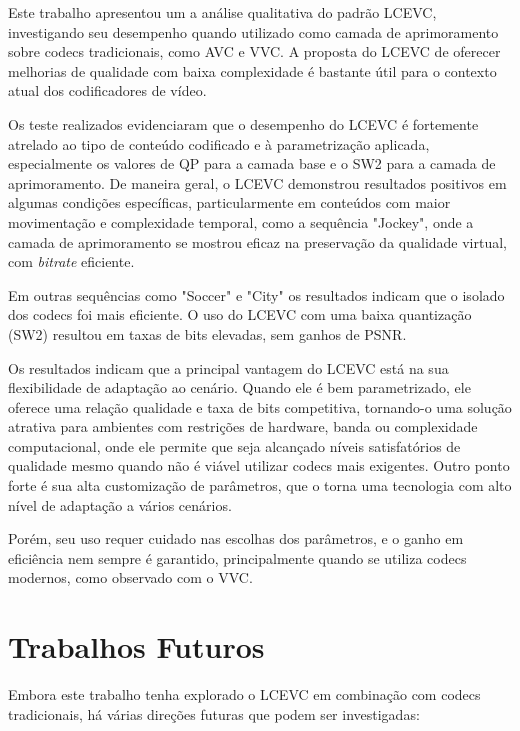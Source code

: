 Este trabalho apresentou um a análise qualitativa do padrão \acrfull{LCEVC},
investigando seu desempenho quando utilizado como camada de aprimoramento sobre
codecs tradicionais, como \acrshort{AVC} e \acrshort{VVC}. A proposta do 
\acrshort{LCEVC} de oferecer melhorias de qualidade com baixa complexidade
é bastante útil para o contexto atual dos codificadores de vídeo.

Os teste realizados evidenciaram que o desempenho do \acrshort{LCEVC} é 
fortemente atrelado ao tipo de conteúdo codificado e à parametrização
aplicada, especialmente os valores de QP para a camada base e o SW2
para a camada de aprimoramento. De maneira geral, o \acrshort{LCEVC}
demonstrou resultados positivos em algumas condições específicas,
particularmente em conteúdos com maior movimentação e complexidade
temporal, como a sequência "Jockey", onde a camada de aprimoramento
se mostrou eficaz na preservação da qualidade virtual, com \textit{bitrate}
eficiente.

Em outras sequências como "Soccer" e "City" os resultados indicam que
o isolado dos codecs foi mais eficiente. O uso do \acrshort{LCEVC} com
uma baixa quantização (SW2) resultou em taxas de bits elevadas, sem ganhos
de \acrshort{PSNR}.

Os resultados indicam que a principal vantagem do \acrshort{LCEVC} está
na sua flexibilidade de adaptação ao cenário. Quando ele é bem parametrizado,
ele oferece uma relação qualidade e taxa de bits competitiva, tornando-o uma
solução atrativa para ambientes com restrições de hardware, banda ou complexidade
computacional, onde ele permite que seja alcançado níveis satisfatórios de qualidade
mesmo quando não é viável utilizar codecs mais exigentes. Outro ponto forte é sua
alta customização de parâmetros, que o torna uma tecnologia com alto nível de
adaptação a vários cenários. 

Porém, seu uso requer cuidado nas escolhas dos parâmetros, e o ganho em eficiência nem sempre
é garantido, principalmente quando se utiliza codecs modernos, como observado
com o \acrshort{VVC}.

\section{Trabalhos Futuros}

Embora este trabalho tenha explorado o \acrshort{LCEVC} em combinação com codecs
tradicionais, há várias direções futuras que podem ser investigadas:

